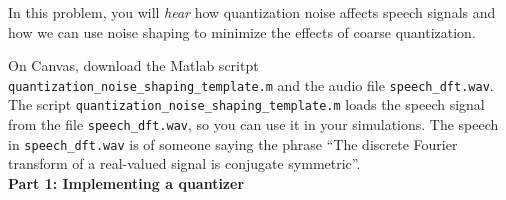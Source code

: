 \documentclass[12pt]{report}
\begin{document}

In this problem, you will \textit{hear} how quantization noise affects speech signals and how we can use noise shaping to minimize the effects of coarse quantization.

On Canvas, download the Matlab scritpt \texttt{quantization\_noise\_shaping\_template.m} and the audio file \texttt{speech\_dft.wav}. The script \texttt{quantization\_noise\_shaping\_template.m} loads the speech signal from the file \texttt{speech\_dft.wav}, so you can use it in your simulations. The speech in \texttt{speech\_dft.wav} is of someone saying the phrase ``The discrete Fourier transform of a real-valued signal is conjugate symmetric''. 
~\\

\noindent\textbf{Part 1: Implementing a quantizer}
\end{document}
